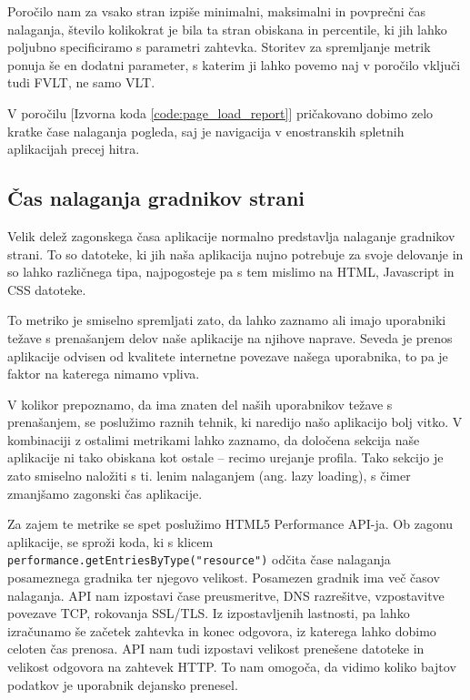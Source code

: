 \documentclass[a4paper, 12pt]{book}
\begin{document}
Poročilo nam za vsako stran izpiše minimalni, maksimalni in povprečni čas nalaganja, število kolikokrat je bila ta stran obiskana in percentile, ki jih lahko poljubno specificiramo s parametri zahtevka. Storitev za spremljanje metrik ponuja še en dodatni parameter, s katerim ji lahko povemo naj v poročilo vključi tudi FVLT, ne samo VLT.

V poročilu [Izvorna koda \ref{code:page_load_report}] pričakovano dobimo zelo kratke čase nalaganja pogleda, saj je navigacija v enostranskih spletnih aplikacijah precej hitra.

\subsection{Čas nalaganja gradnikov strani}
\label{ch2:sec3}

Velik delež zagonskega časa aplikacije normalno predstavlja nalaganje gradnikov strani. To so datoteke, ki jih naša aplikacija nujno potrebuje za svoje delovanje in so lahko različnega tipa, najpogosteje pa s tem mislimo na HTML, Javascript in CSS datoteke.

To metriko je smiselno spremljati zato, da lahko zaznamo ali imajo uporabniki težave s prenašanjem delov naše aplikacije na njihove naprave. Seveda je prenos aplikacije odvisen od kvalitete internetne povezave našega uporabnika, to pa je faktor na katerega nimamo vpliva.

V kolikor prepoznamo, da ima znaten del naših uporabnikov težave s prenašanjem, se poslužimo raznih tehnik, ki naredijo našo aplikacijo bolj vitko. V kombinaciji z ostalimi metrikami lahko zaznamo, da določena sekcija naše aplikacije ni tako obiskana kot ostale -- recimo urejanje profila. Tako sekcijo je zato smiselno naložiti s ti. lenim nalaganjem (ang. lazy loading), s čimer zmanjšamo zagonski čas aplikacije.

Za zajem te metrike se spet poslužimo HTML5 Performance API-ja. Ob zagonu aplikacije, se sproži koda, ki s klicem \\ \verb|performance.getEntriesByType("resource")| odčita čase nalaganja posameznega gradnika ter njegovo velikost. Posamezen gradnik ima več časov nalaganja. API nam izpostavi čase preusmeritve, DNS razrešitve, vzpostavitve povezave TCP, rokovanja SSL/TLS. Iz izpostavljenih lastnosti, pa lahko izračunamo še začetek zahtevka in konec odgovora, iz katerega lahko dobimo celoten čas prenosa. API nam tudi izpostavi velikost prenešene datoteke in velikost odgovora na zahtevek HTTP. To nam omogoča, da vidimo koliko bajtov podatkov je uporabnik dejansko prenesel.
\end{document}
